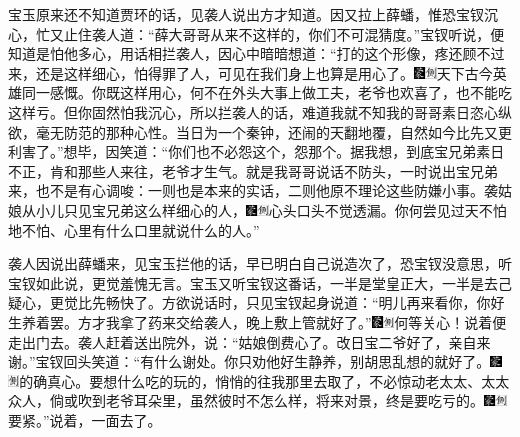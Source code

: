 宝玉原来还不知道贾环的话，见袭人说出方才知道。因又拉上薛蟠，惟恐宝钗沉心，忙又止住袭人道：``薛大哥哥从来不这样的，你们不可混猜度。''宝钗听说，便知道是怕他多心，用话相拦袭人，因心中暗暗想道：``打的这个形像，疼还顾不过来，还是这样细心，怕得罪了人，可见在我们身上也算是用心了。{\includegraphics[width=3mm]{../Images/00006}\includegraphics[width=3mm]{../Images/00011}\footnotesize \kaishu 天下古今英雄同一感慨。}你既这样用心，何不在外头大事上做工夫，老爷也欢喜了，也不能吃这样亏。但你固然怕我沉心，所以拦袭人的话，难道我就不知我的哥哥素日恣心纵欲，毫无防范的那种心性。当日为一个秦钟，还闹的天翻地覆，自然如今比先又更利害了。''想毕，因笑道：``你们也不必怨这个，怨那个。据我想，到底宝兄弟素日不正，肯和那些人来往，老爷才生气。就是我哥哥说话不防头，一时说出宝兄弟来，也不是有心调唆：一则也是本来的实话，二则他原不理论这些防嫌小事。袭姑娘从小儿只见宝兄弟这么样细心的人，{\includegraphics[width=3mm]{../Images/00006}\includegraphics[width=3mm]{../Images/00011}\footnotesize \kaishu 心头口头不觉透漏。}你何尝见过天不怕地不怕、心里有什么口里就说什么的人。''

袭人因说出薛蟠来，见宝玉拦他的话，早已明白自己说造次了，恐宝钗没意思，听宝钗如此说，更觉羞愧无言。宝玉又听宝钗这番话，一半是堂皇正大，一半是去己疑心，更觉比先畅快了。方欲说话时，只见宝钗起身说道：``明儿再来看你，你好生养着罢。方才我拿了药来交给袭人，晚上敷上管就好了。''{\includegraphics[width=3mm]{../Images/00006}\includegraphics[width=3mm]{../Images/00011}\footnotesize \kaishu 何等关心！}说着便走出门去。袭人赶着送出院外，说：``姑娘倒费心了。改日宝二爷好了，亲自来谢。''宝钗回头笑道：``有什么谢处。你只劝他好生静养，别胡思乱想的就好了。{\includegraphics[width=3mm]{../Images/00006}\includegraphics[width=3mm]{../Images/00011}\footnotesize \kaishu 的确真心。}要想什么吃的玩的，悄悄的往我那里去取了，不必惊动老太太、太太众人，倘或吹到老爷耳朵里，虽然彼时不怎么样，将来对景，终是要吃亏的。{\includegraphics[width=3mm]{../Images/00006}\includegraphics[width=3mm]{../Images/00011}\footnotesize \kaishu 要紧。}''说着，一面去了。


